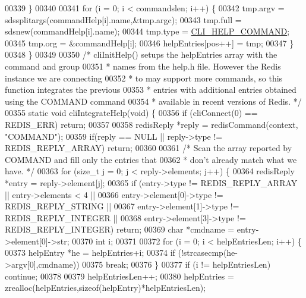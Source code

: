 \begin{DoxyCode}
{{{{{{{00339     \}
00340 
00341     \textcolor{keywordflow}{for} (i = 0; i < commandslen; i++) \{
00342         tmp.argv = sdssplitargs(commandHelp[i].name,&tmp.argc);
00343         tmp.full = sdsnew(commandHelp[i].name);
00344         tmp.type = \hyperlink{redis-cli_8c_ad5a18b7d635c6438f512f3c5d7f9f546}{CLI\_HELP\_COMMAND};
00345         tmp.org = &commandHelp[i];
00346         helpEntries[pos++] = tmp;
00347     \}
00348 \}
00349 
00350 \textcolor{comment}{/* cliInitHelp() setups the helpEntries array with the command and group}
00351 \textcolor{comment}{ * names from the help.h file. However the Redis instance we are connecting}
00352 \textcolor{comment}{ * to may support more commands, so this function integrates the previous}
00353 \textcolor{comment}{ * entries with additional entries obtained using the COMMAND command}
00354 \textcolor{comment}{ * available in recent versions of Redis. */}
00355 \textcolor{keyword}{static} \textcolor{keywordtype}{void} cliIntegrateHelp(\textcolor{keywordtype}{void}) \{
00356     \textcolor{keywordflow}{if} (cliConnect(0) == REDIS\_ERR) \textcolor{keywordflow}{return};
00357 
00358     redisReply *reply = redisCommand(context, \textcolor{stringliteral}{"COMMAND"});
00359     \textcolor{keywordflow}{if}(reply == NULL || reply->type != REDIS\_REPLY\_ARRAY) \textcolor{keywordflow}{return};
00360 
00361     \textcolor{comment}{/* Scan the array reported by COMMAND and fill only the entries that}
00362 \textcolor{comment}{     * don't already match what we have. */}
00363     \textcolor{keywordflow}{for} (size\_t j = 0; j < reply->elements; j++) \{
00364         redisReply *entry = reply->element[j];
00365         \textcolor{keywordflow}{if} (entry->type != REDIS\_REPLY\_ARRAY || entry->elements < 4 ||
00366             entry->element[0]->type != REDIS\_REPLY\_STRING ||
00367             entry->element[1]->type != REDIS\_REPLY\_INTEGER ||
00368             entry->element[3]->type != REDIS\_REPLY\_INTEGER) \textcolor{keywordflow}{return};
00369         \textcolor{keywordtype}{char} *cmdname = entry->element[0]->str;
00370         \textcolor{keywordtype}{int} i;
00371 
00372         \textcolor{keywordflow}{for} (i = 0; i < helpEntriesLen; i++) \{
00373             helpEntry *he = helpEntries+i;
00374             \textcolor{keywordflow}{if} (!strcasecmp(he->argv[0],cmdname))
00375                 \textcolor{keywordflow}{break};
00376         \}
00377         \textcolor{keywordflow}{if} (i != helpEntriesLen) \textcolor{keywordflow}{continue};
00378 
00379         helpEntriesLen++;
00380         helpEntries = zrealloc(helpEntries,\textcolor{keyword}{sizeof}(helpEntry)*helpEntriesLen);
}}}}}}}
\end{DoxyCode}
